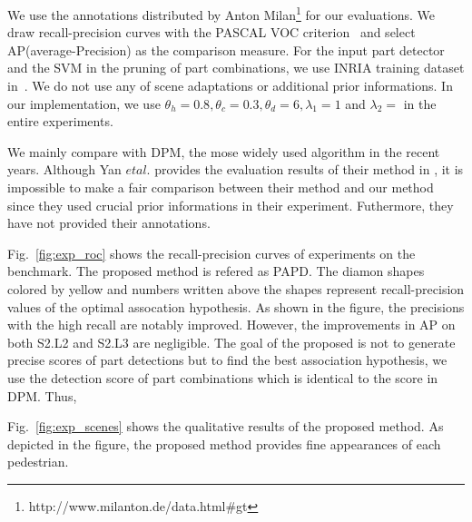 \documentclass[10pt,twocolumn,letterpaper]{article}
\begin{document}
We use the annotations distributed by Anton Milan\footnote{http://www.milanton.de/data.html\#gt} for our evaluations.
We draw recall-precision curves with the PASCAL VOC criterion~\cite{everingham2010pascal} and select AP(average-Precision) as the comparison measure.
For the input part detector and the SVM in the pruning of part combinations, we use INRIA training dataset in~\cite{dalal2005histograms}.
We do not use any of scene adaptations or additional prior informations.
In our implementation, we use $\theta_h = 0.8, \theta_c = 0.3, \theta_d = 6, \lambda_1 = 1$ and $\lambda_2 = $ in the entire experiments.

We mainly compare with DPM, the mose widely used algorithm in the recent years.
Although Yan $et al.$ provides the evaluation results of their method in \cite{yan2012multi}, it is impossible to make a fair comparison between their method and our method since they used crucial prior informations in their experiment.
Futhermore, they have not provided their annotations.

Fig.~\ref{fig:exp_roc} shows the recall-precision curves of experiments on the benchmark. 
The proposed method is refered as PAPD.
The diamon shapes colored by yellow and numbers written above the shapes represent recall-precision values of the optimal assocation hypothesis.
As shown in the figure, the precisions with the high recall are notably improved.
However, the improvements in AP on both S2.L2 and S2.L3 are negligible.
The goal of the proposed is not to generate precise scores of part detections but to find the best association hypothesis, we use the detection score of part combinations which is identical to the score in DPM.
Thus, 

Fig.~\ref{fig:exp_scenes} shows the qualitative results of the proposed method. As depicted in the figure, the proposed method provides fine appearances of each pedestrian.

\end{document}
